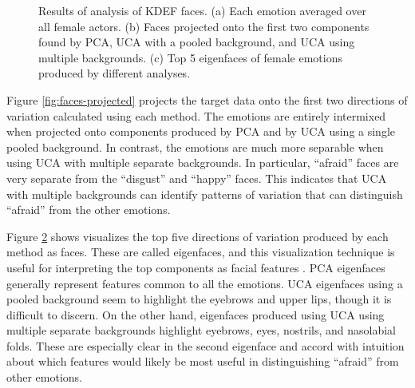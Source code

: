 \documentclass[12pt]{article}
\begin{document}
\begin{figure}
\begin{subfigure}{.49\linewidth}
    \caption{}
   \label{fig:faces-eigenfaces}
    \end{subfigure}
\caption{Results of analysis of KDEF faces.  (a) Each emotion averaged over all female actors. (b) Faces projected onto the first two components found by PCA, UCA with a pooled background, and UCA using multiple backgrounds. (c) Top 5 eigenfaces of female emotions produced by different analyses.}
\end{figure}

Figure \ref{fig:faces-projected} projects the target data onto the first two directions of variation calculated using each method. The emotions are entirely intermixed when projected onto components produced by PCA and by UCA using a single pooled background. In contrast, the emotions are much more separable when using UCA with multiple separate backgrounds. In particular, ``afraid'' faces are very separate from the ``disgust'' and ``happy'' faces. This indicates that UCA with multiple backgrounds can identify patterns of variation that can distinguish ``afraid'' from the other emotions.

Figure \ref{fig:faces-eigenfaces} shows visualizes the top five directions of variation produced by each method as faces. These are called eigenfaces, and this visualization technique is useful for interpreting the top components as facial features \cite{turk1991eigenfaces}. PCA eigenfaces generally represent features common to all the emotions. UCA eigenfaces using a pooled background seem to highlight the eyebrows and upper lips, though it is difficult to discern. On the other hand, eigenfaces produced using UCA using multiple separate backgrounds highlight eyebrows, eyes, nostrils, and nasolabial folds. These are especially clear in the second eigenface and accord with intuition about which features would likely be most useful in distinguishing ``afraid'' from other emotions.





\end{document}
